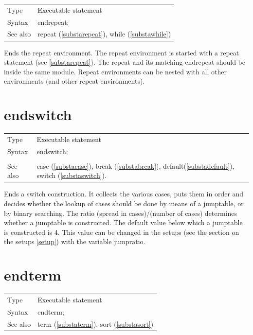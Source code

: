 \noindent \begin{tabular}{ll}
Type & Executable statement\\
Syntax & endrepeat;
\\ See also & repeat (\ref{substarepeat}), while (\ref{substawhile})
\end{tabular} \vspace{4mm}

\noindent Ends the repeat 
environment. The repeat environment is started 
with a repeat statement (see \ref{substarepeat}). The repeat and its 
matching endrepeat should be inside the same module. 
Repeat environments can be nested with all other environments (and other 
repeat environments). \vspace{10mm}

%
\section{endswitch}
\label{substaendswitch}

\noindent \begin{tabular}{ll}
Type & Executable statement\\
Syntax & endswitch; \\
\\ See also & case (\ref{substacase}), break (\ref{substabreak}),
		 default(\ref{substadefault}), switch (\ref{substaswitch}).
\end{tabular} \vspace{4mm}

\noindent Ends a switch construction. It collects the various cases, puts 
them in order and decides whether the lookup of cases should be done by 
means of a jumptable, or by binary searching. The ratio (spread in 
cases)/(number of cases) determines whether a jumptable is constructed. The 
default value below which a jumptable is constructed is 4. This value can 
be changed in the setups (see the section on the setups \ref{setup}) with 
the variable jumpratio.

\vspace{10mm}
%

\section{endterm}
\label{substaendterm}

\noindent \begin{tabular}{ll}
Type & Executable statement\\
Syntax & endterm;
\\ See also & term (\ref{substaterm}), sort (\ref{substasort})
\end{tabular} \vspace{4mm}

